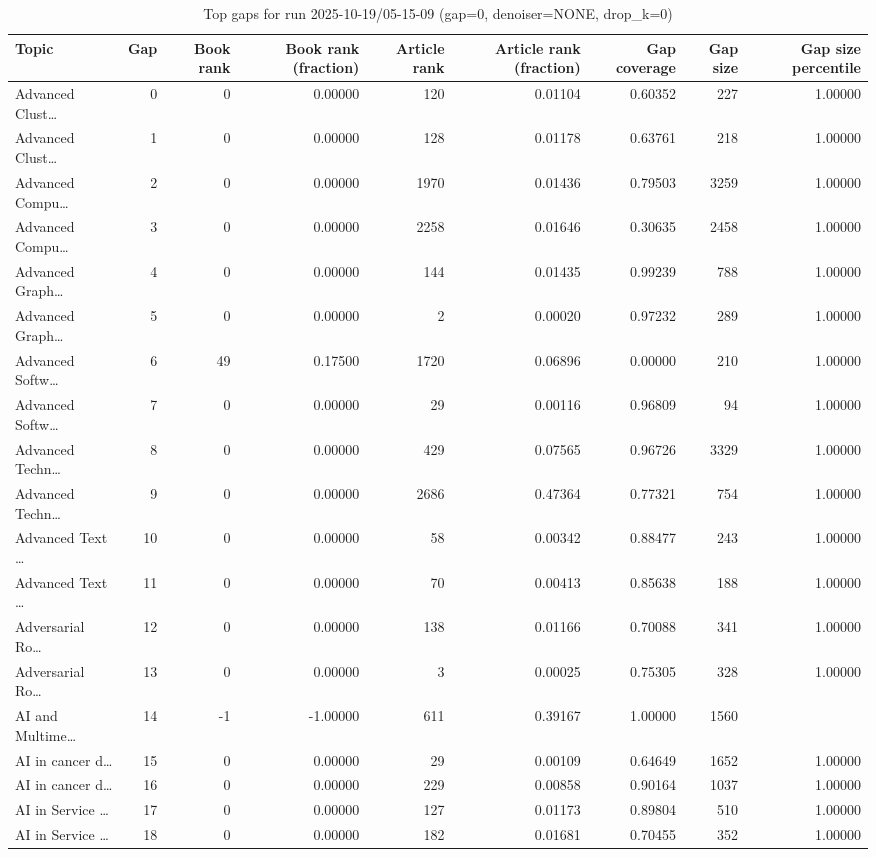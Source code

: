 \begin{table}
\caption{Top gaps for run 2025-10-19/05-15-09 (gap=0, denoiser=NONE, drop\_k=0)}
\label{tab:best_run_gap0_2025_10_19_05_15_09}
\begin{tabular}{lrrrrrrrr}
\toprule
Topic & Gap & Book rank & Book rank (fraction) & Article rank & Article rank (fraction) & Gap coverage & Gap size & Gap size percentile \\
\midrule
Advanced Clust… & 0 & 0 & 0.00000 & 120 & 0.01104 & 0.60352 & 227 & 1.00000 \\
Advanced Clust… & 1 & 0 & 0.00000 & 128 & 0.01178 & 0.63761 & 218 & 1.00000 \\
Advanced Compu… & 2 & 0 & 0.00000 & 1970 & 0.01436 & 0.79503 & 3259 & 1.00000 \\
Advanced Compu… & 3 & 0 & 0.00000 & 2258 & 0.01646 & 0.30635 & 2458 & 1.00000 \\
Advanced Graph… & 4 & 0 & 0.00000 & 144 & 0.01435 & 0.99239 & 788 & 1.00000 \\
Advanced Graph… & 5 & 0 & 0.00000 & 2 & 0.00020 & 0.97232 & 289 & 1.00000 \\
Advanced Softw… & 6 & 49 & 0.17500 & 1720 & 0.06896 & 0.00000 & 210 & 1.00000 \\
Advanced Softw… & 7 & 0 & 0.00000 & 29 & 0.00116 & 0.96809 & 94 & 1.00000 \\
Advanced Techn… & 8 & 0 & 0.00000 & 429 & 0.07565 & 0.96726 & 3329 & 1.00000 \\
Advanced Techn… & 9 & 0 & 0.00000 & 2686 & 0.47364 & 0.77321 & 754 & 1.00000 \\
Advanced Text … & 10 & 0 & 0.00000 & 58 & 0.00342 & 0.88477 & 243 & 1.00000 \\
Advanced Text … & 11 & 0 & 0.00000 & 70 & 0.00413 & 0.85638 & 188 & 1.00000 \\
Adversarial Ro… & 12 & 0 & 0.00000 & 138 & 0.01166 & 0.70088 & 341 & 1.00000 \\
Adversarial Ro… & 13 & 0 & 0.00000 & 3 & 0.00025 & 0.75305 & 328 & 1.00000 \\
AI and Multime… & 14 & -1 & -1.00000 & 611 & 0.39167 & 1.00000 & 1560 &  \\
AI in cancer d… & 15 & 0 & 0.00000 & 29 & 0.00109 & 0.64649 & 1652 & 1.00000 \\
AI in cancer d… & 16 & 0 & 0.00000 & 229 & 0.00858 & 0.90164 & 1037 & 1.00000 \\
AI in Service … & 17 & 0 & 0.00000 & 127 & 0.01173 & 0.89804 & 510 & 1.00000 \\
AI in Service … & 18 & 0 & 0.00000 & 182 & 0.01681 & 0.70455 & 352 & 1.00000 \\

\end{tabular}
\end{table}
